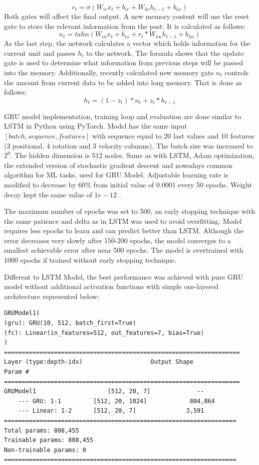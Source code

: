 \begin{equation}
r_t = \sigma (W_{ir}x_t + b_{ir} + W_{hr}h_{t-1} + b_{hr})
\end{equation}
Both gates will affect the final output. A new memory content will use the reset gate to store the relevant information from the past. It is calculated as follows:
\begin{equation}
n_t = tahn (W_{in}x_t + b_{in} + r_t * W_{hn}h_{t-1} + b_{hn})
\end{equation}
As the last step, the network calculates a vector which holds information for the current unit and passes $h_t$ to the network. The formula shows that the update gate is used to determine what information from previous steps will be passed into the memory. Additionally, recently calculated new memory gate $n_t$ controls the amount from current data to be added into long memory.  That is done as follows:
\begin{equation}
h_t = (1 - z_t) * n_t + z_t * h_{t-1}
\end{equation}

GRU model implementation, training loop and evaluation are done similar to LSTM in Python using PyTorch. Model has the same input $[batch, sequence, features]$ with sequence equal to 20 last values and 10 features (3 positional, 4 rotation and 3 velocity columns). The batch size was increased to $2^{9}$. The hidden dimension  is 512 nodes. Same as with LSTM, Adam optimization, the extended version of stochastic gradient descent and nowadays common algorithm for ML tasks, used for GRU Model.  Adjustable learning rate is modified to decrease by 60\% from initial value of 0.0001 every 50 epochs. Weight decay kept the same value of $1e-12$ . 

The maximum number of epochs was set to 500, an early stopping technique with the same patience and delta as in LSTM was used to avoid overfitting. Model requires less epochs to learn and can predict better than LSTM. Although the error decreases very slowly after 150-200 epochs, the model converges to a smallest achievable error after near 500 epochs. The model is overtrained with 1000 epochs if trained without early stopping technique.

Different to LSTM Model, the best performance was achieved with pure GRU model without additional activation functions with simple one-layered architecture represented below:
\begin{lstlisting}[caption={GRU1 with Sliding Window},captionpos=b]
GRUModel1(
(gru): GRU(10, 512, batch_first=True)
(fc): Linear(in_features=512, out_features=7, bias=True)
)
==================================================================
Layer (type:depth-idx)                   Output Shape              Param #
==================================================================
GRUModel1                    [512, 20, 7]             --
	--- GRU: 1-1         [512, 20, 1024]            804,864
	--- Linear: 1-2      [512, 20, 7]              3,591
=================================================================
Total params: 808,455
Trainable params: 808,455
Non-trainable params: 0
=================================================================
\end{lstlisting}

